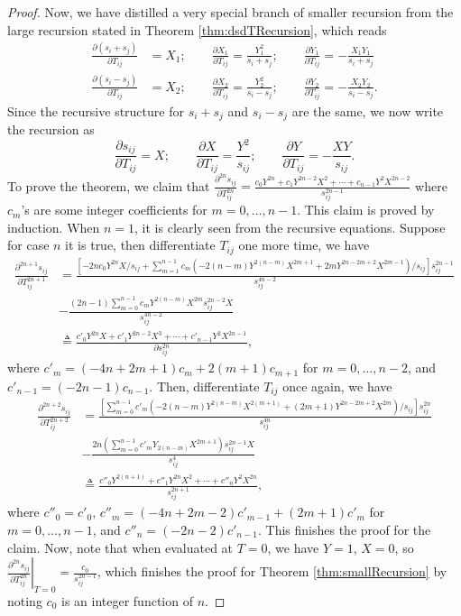 \documentclass[10pt]{article}
\begin{document}
\begin{proof}
	Now, we have distilled a very special branch of smaller recursion from the large recursion stated in Theorem \ref{thm:dsdTRecursion}, which reads
	\begin{align}
		\frac{\partial (s_i+s_j)}{\partial T_{ij}} &= X_1; \qquad \frac{\partial X_1}{\partial T_{ij}} = \frac{Y_1^2}{s_i+s_j}; \qquad \frac{\partial Y_1}{\partial T_{ij}} = -\frac{X_1Y_1}{s_i+s_j} \nonumber \\
		\frac{\partial (s_i-s_j)}{\partial T_{ij}} &= X_2; \qquad \frac{\partial X_2}{\partial T_{ij}} = \frac{Y_2^2}{s_i-s_j}; \qquad \frac{\partial Y_2}{\partial T_{ij}} = -\frac{X_2Y_2}{s_i-s_j}.
	\end{align}
	Since the recursive structure for $s_i+s_j$ and $s_i-s_j$ are the same, we now write the recursion as
	\begin{equation*}
		\frac{\partial s_{ij}}{\partial T_{ij}} = X; \qquad \frac{\partial X}{\partial T_{ij}} = \frac{Y^2}{s_{ij}}; \qquad \frac{\partial Y}{\partial T_{ij}} = -\frac{XY}{s_{ij}}.
	\end{equation*}
	To prove the theorem, we claim that $\frac{\partial^{2n} s_{ij}}{\partial T_{ij}^{2n}} = \frac{c_0Y^{2n} + c_1Y^{2n-2}X^2 + \cdots + c_{n-1}Y^2X^{2n-2}}{s_{ij}^{2n-1}}$ where $c_m$'s are some integer coefficients for $m=0,\ldots,n-1$.
	This claim is proved by induction.
	When $n=1$, it is clearly seen from the recursive equations.
	Suppose for case $n$ it is true, then differentiate $T_{ij}$ one more time, we have
	\begin{align*}
		\frac{\partial^{2n+1} s_{ij}}{\partial T_{ij}^{2n+1}} &= \frac{\left[ -2nc_0Y^{2n}X/s_{ij} + \sum_{m=1}^{n-1}c_m\left( -2(n-m)Y^{2(n-m)}X^{2m+1} + 2mY^{2n-2m+2}X^{2m-1} \right)/s_{ij} \right] s_{ij}^{2n-1}}{s_{ij}^{4n-2}} \\
		&- \frac{(2n-1) \sum_{m=0}^{n-1}c_mY^{2(n-m)}X^{2m} s_{ij}^{2n-2}X}{s_{ij}^{4n-2}} \\
		&\triangleq \frac{c'_0Y^{2n}X + c'_1Y^{2n-2}X^3 + \cdots + c'_{n-1}Y^2X^{2n-1}}{\partial s_{ij}^{2n}},
	\end{align*}
	where $c'_m = (-4n+2m+1)c_m + 2(m+1)c_{m+1}$ for $m=0,\ldots,n-2$, and $c'_{n-1} = (-2n-1)c_{n-1}$.
	Then, differentiate $T_{ij}$ once again, we have
	\begin{align*}
		\frac{\partial^{2n+2} s_{ij}}{\partial T_{ij}^{2n+2}} &= \frac{\left[ \sum_{m=0}^{n-1}c'_m\left( -2(n-m)Y^{2(n-m)}X^{2(m+1)} + (2m+1)Y^{2n-2m+2}X^{2m} \right)/s_{ij} \right]s_{ij}^{2n}}{s_{ij}^{4n}} \\
		&- \frac{2n\left( \sum_{m=0}^{n-1}c'_mY_{2(n-m)}X^{2m+1} \right)s_{ij}^{2n-1}X }{s_{ij}^4} \\
		&\triangleq \frac{c''_0Y^{2(n+1)} + c''_1Y^{2n}X^2 + \cdots + c''_{n}Y^2X^{2n}}{s_{ij}^{2n+1}},
	\end{align*}
	where $c''_0 = c'_0$, $c''_m = (-4n+2m-2)c'_{m-1} + (2m+1)c'_m$ for $m=0,\ldots,n-1$, and $c''_n = (-2n-2)c'_{n-1}$.
	This finishes the proof for the claim.
	Now, note that when evaluated at $T=0$, we have $Y=1$, $X=0$, so $\left. \frac{\partial^{2n}s_{ij}}{\partial T_{ij}^{2n}} \right|_{T=0} = \frac{c_0}{s_{ij}^{2n-1}}$, which finishes the proof for Theorem \ref{thm:smallRecursion} by noting $c_0$ is an integer function of $n$.
\end{proof}
\end{document}
